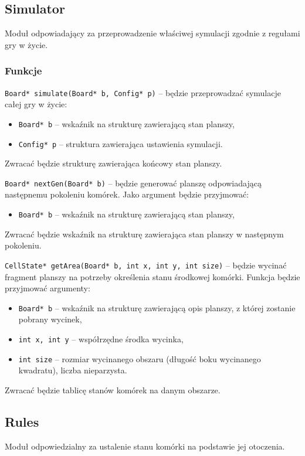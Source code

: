 \documentclass{article}
\begin{document}
\subsection{Simulator}
Moduł odpowiadający za przeprowadzenie właściwej symulacji zgodnie z regułami gry w życie.

\subsubsection{Funkcje}
\texttt{Board* simulate(Board* b, Config* p)} -- będzie przeprowadzać symulacje\\ całej gry w życie:
\begin{itemize}[label={}]
	\item \texttt{Board* b} -- wskaźnik na strukturę zawierającą stan planszy,
	\item \texttt{Config* p} -- struktura zawierająca ustawienia symulacji.
\end{itemize}
Zwracać będzie strukturę zawierająca końcowy stan planszy.

\vspace{5mm}

\noindent{}\texttt{Board* nextGen(Board* b)} -- będzie generować planszę odpowiadającą następnemu pokoleniu komórek. Jako argument będzie przyjmować:
\begin{itemize}[label={}]
	\item \texttt{Board* b} -- wskaźnik na strukturę zawierającą stan planszy,
\end{itemize}
Zwracać będzie wskaźnik na strukturę zawierająca stan planszy w następnym pokoleniu.

\noindent{}\texttt{CellState* getArea(Board* b, int x, int y, int size)} -- będzie wycinać fragment planszy na potrzeby określenia stanu środkowej komórki. Funkcja będzie przyjmować argumenty:
\begin{itemize}[label={}]
	\item \texttt{Board* b} -- wskaźnik na strukturę zawierającą opis planszy, z której zostanie pobrany wycinek,
	\item \texttt{int x, int y} -- współrzędne środka wycinka,
	\item \texttt{int size} -- rozmiar wycinanego obszaru (długość boku wycinanego kwadratu), liczba nieparzysta.
\end{itemize}
Zwracać będzie tablicę stanów komórek na danym obszarze.

\subsection{Rules}
Moduł odpowiedzialny za ustalenie stanu komórki na podstawie jej otoczenia.
\end{document}
